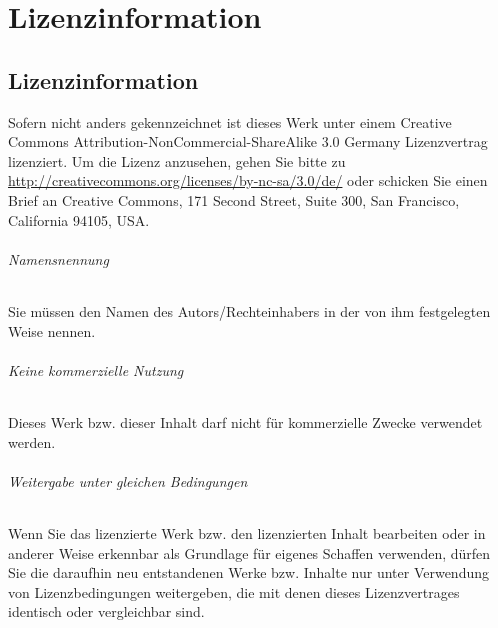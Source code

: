 \part {Lizenzinformation}
\chapter {Lizenzinformation}
\label{chapt:Lizenzinformation}
Sofern nicht anders gekennzeichnet ist dieses Werk unter einem Creative Commons Attribution-NonCommercial-ShareAlike 3.0 Germany Lizenzvertrag lizenziert. Um die Lizenz anzusehen, gehen Sie bitte zu \url{http://creativecommons.org/licenses/by-nc-sa/3.0/de/} oder schicken Sie einen Brief an Creative Commons, 171 Second Street, Suite 300, San Francisco, California 94105, USA.

\paragraph*{Namensnennung}
Sie müssen den Namen des Autors/Rechteinhabers in der von ihm festgelegten Weise nennen.

\paragraph*{Keine kommerzielle Nutzung}
Dieses Werk bzw. dieser Inhalt darf nicht für kommerzielle Zwecke verwendet werden.

\paragraph*{Weitergabe unter gleichen Bedingungen}
Wenn Sie das lizenzierte Werk bzw. den lizenzierten Inhalt bearbeiten oder in anderer Weise erkennbar als Grundlage für eigenes Schaffen verwenden, dürfen Sie die daraufhin neu entstandenen Werke bzw. Inhalte nur unter Verwendung von Lizenzbedingungen weitergeben, die mit denen dieses Lizenzvertrages identisch oder vergleichbar sind. 
